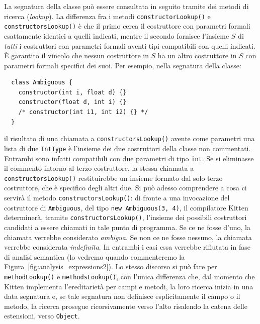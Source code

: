 La segnatura della classe pu\`o essere
consultata in seguito tramite dei metodi di ricerca (\emph{lookup}).
La differenza fra i metodi
\texttt{constructorLookup()} e \texttt{constructorsLookup()} \`e che il
primo cerca il costruttore con parametri formali esattamente identici a quelli
indicati, mentre il secondo fornisce l'insieme $S$ di
\emph{tutti} i costruttori con parametri
formali aventi tipi compatibili con quelli indicati.
\`E garantito il vincolo che
nessun costruttore in $S$ ha un altro costruttore in $S$ con parametri
formali \piu specifici dei suoi. Per esempio, nella segnatura della classe:
%
\begin{verbatim}
  class Ambiguous {
    constructor(int i, float d) {}
    constructor(float d, int i) {}
    /* constructor(int i1, int i2) {} */
  }
\end{verbatim}
%
il risultato di una chiamata a
\texttt{constructorsLookup()} avente come parametri una lista di
due \texttt{IntType} \`e l'insieme dei
due costruttori della classe non commentati.
Entrambi sono infatti compatibili con
due parametri di tipo \texttt{int}. Se si eliminasse il commento intorno
al terzo costruttore, la stessa chiamata a \texttt{constructorsLookup()}
restituirebbe un insieme formato dal solo
terzo costruttore, che \`e \piu specifico degli altri due.
Si pu\`o adesso comprendere a cosa ci servir\`a il metodo
\texttt{constructorsLookup()}:
di fronte a una invocazione del costruttore di \texttt{Ambiguous},
del tipo \texttt{new Ambiguous(3, 4)}, il compilatore Kitten
determiner\`a, tramite \texttt{constructorsLookup()}, l'insieme
dei possibili costruttori candidati a essere chiamati in tale punto di
programma. Se ce ne fosse \piu d'uno, la chiamata verrebbe considerato
\emph{ambigua}. Se non ce ne fosse nessuno, la
chiamata verrebbe considerata \emph{indefinita}.
In entrambi i casi essa verrebbe rifiutata in fase di analisi semantica
(lo vedremo quando commenteremo la Figura~\ref{fig:analysis_expressions2}).
Lo stesso discorso si pu\`o fare per
\texttt{methodLookup()} e \texttt{methodsLookup()}, con l'unica differenza che,
dal momento che Kitten implementa l'ereditariet\`a per campi e metodi,
la loro ricerca inizia in una data segnatura e,
se tale segnatura non definisce esplicitamente il campo o il metodo, la ricerca
prosegue ricorsivamente verso l'alto risalendo la catena delle estensioni,
verso \texttt{Object}.

